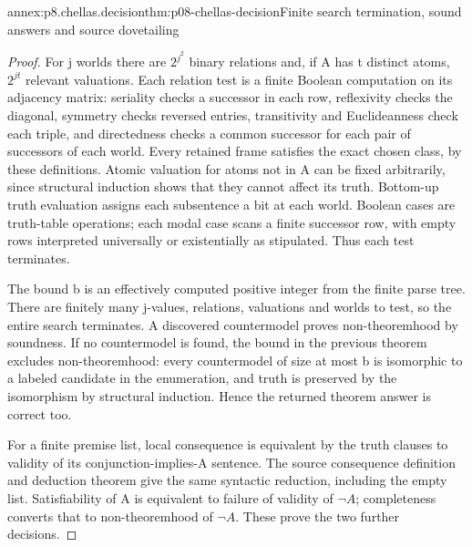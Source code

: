 \begin{annexitem}{annex:p8.chellas.decision}{thm:p08-chellas-decision}{Finite search termination, sound answers and source dovetailing}
\begin{proof}
For j worlds there are \(2^{j^2}\) binary relations and, if A has
t distinct atoms, \(2^{jt}\) relevant valuations. Each relation
test is a finite Boolean computation on its adjacency matrix:
seriality checks a successor in each row, reflexivity checks the
diagonal, symmetry checks reversed entries, transitivity and
Euclideanness check each triple, and directedness checks a common
successor for each pair of successors of each world. Every retained
frame satisfies the exact chosen class, by these definitions.
Atomic valuation for atoms not in A can be fixed arbitrarily,
since structural induction shows that they cannot affect its truth.
Bottom-up truth evaluation assigns each subsentence a bit at each
world. Boolean cases are truth-table operations; each modal case
scans a finite successor row, with empty rows interpreted
universally or existentially as stipulated. Thus each test terminates.

The bound b is an effectively computed positive integer from the
finite parse tree. There are finitely many j-values, relations,
valuations and worlds to test, so the entire search terminates.
A discovered countermodel proves non-theoremhood by soundness.
If no countermodel is found, the bound in the previous theorem
excludes non-theoremhood: every countermodel of size at most b
is isomorphic to a labeled candidate in the enumeration, and
truth is preserved by the isomorphism by structural induction.
Hence the returned theorem answer is correct too.

For a finite premise list, local consequence is equivalent by
the truth clauses to validity of its conjunction-implies-A
sentence. The source consequence definition and deduction theorem
give the same syntactic reduction, including the empty list.
Satisfiability of A is equivalent to failure of validity of
\(\neg A\); completeness converts that to non-theoremhood of
\(\neg A\). These prove the two further decisions.


\end{proof}
\end{annexitem}
